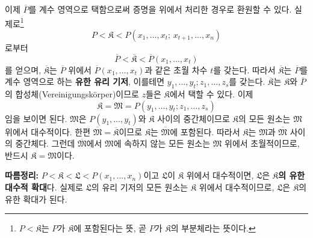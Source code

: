 \documentclass[11pt]{article}
\begin{document}
이제 $\overline P$를 계수 영역으로 택함으로써 증명을 위에서 처리한 경우로 환원할 수 있다. 실제로\footnote{$P<\mathfrak K$는 $P$가 $\mathfrak K$에 포함된다는 뜻, 곧 $P$가 $\mathfrak K$의 부분체라는 뜻이다.}
\[
P<\mathfrak K<P(x_1,\ldots,x_t;\,x_{t+1},\ldots,x_n)
\]
로부터
\[
\overline P<\overline{\mathfrak K}<\overline P(x_1,\ldots,x_t)
\]
를 얻으며, $\overline{\mathfrak K}$는 $\overline P$ 위에서 $\overline P(x_1,\ldots,x_t)$과 같은 초월 차수 $t$를 갖는다. 따라서 $\overline{\mathfrak K}$는 $\overline P$를 계수 영역으로 하는 \textbf{유한 유리 기저}, 이를테면 $y_1,\ldots,y_t;z_1,\ldots,z_s$를 갖는다. $\overline{\mathfrak K}$는 $\mathfrak K$와 $\overline P$의 합성체(Vereinigungskörper)이므로 $z$들은 $\mathfrak K$에서 택할 수 있다. 이제
\[
\mathfrak K=\mathfrak M=P(y_1,\ldots,y_t;z_1,\ldots,z_s)
\]
임을 보이면 된다. $\mathfrak M$은 $P(y_1,\ldots,y_t)$와 $\mathfrak K$ 사이의 중간체이므로 $\mathfrak K$의 모든 원소는 $\mathfrak M$ 위에서 대수적이다. 한편 $\overline{\mathfrak M}=\overline{\mathfrak K}$이므로 $\mathfrak K$는 $\overline{\mathfrak M}$에 포함된다. 따라서 $\mathfrak K$는 $\mathfrak M$과 $\overline{\mathfrak M}$ 사이의 중간체다. 그런데 $\overline{\mathfrak M}$에서 $\mathfrak M$에 속하지 않는 모든 원소는 $\mathfrak M$ 위에서 초월적이므로, 반드시 $\mathfrak K=\mathfrak M$이다.

\textbf{따름정리:} $P<\mathfrak K<\mathfrak L<P(x_1,\ldots,x_n)$이고 $\mathfrak L$이 $\mathfrak K$ 위에서 대수적이면, $\mathfrak L$은 \textbf{$\mathfrak K$의 유한 대수적 확대}다. 실제로 $\mathfrak L$의 유리 기저의 모든 원소는 $\mathfrak K$ 위에서 대수적이므로, $\mathfrak L$은 $\mathfrak K$의 유한 확대가 된다.
\end{document}
